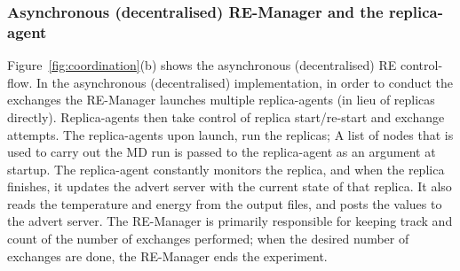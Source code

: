 \documentclass{rspublic}
\newcommand{\jhanote}[1]{ {\textcolor{red} { ***shantenu: #1 }}}
\newcommand{\alnote}[1]{ {\textcolor{blue} { ***andre: #1 }}}
\newcommand{\alnote}[1]{}
\newcommand{\jhanote}[1]{}
\begin{document}

\subsubsection{Asynchronous (decentralised) RE-Manager and the replica-agent}

 

Figure~\ref{fig:coordination}(b) shows the asynchronous
(decentralised) RE control-flow.  In the asynchronous (decentralised)
implementation, in order to conduct the exchanges the RE-Manager
launches multiple replica-agents (in lieu of replicas directly).
Replica-agents then take control of replica start/re-start and
exchange attempts.  The replica-agents upon launch, run the replicas;
A list of nodes that is used to carry out the MD run is passed to the
replica-agent as an argument at startup.  The replica-agent constantly
monitors the replica, and when the replica finishes, it updates the
advert server with the current state of that replica.  It also reads
the temperature and energy from the output files, and posts the values
to the advert server.  The RE-Manager is primarily responsible for
keeping track and count of the number of exchanges performed; when the
desired number of exchanges are done, the RE-Manager ends the
experiment.

  
\end{document}
